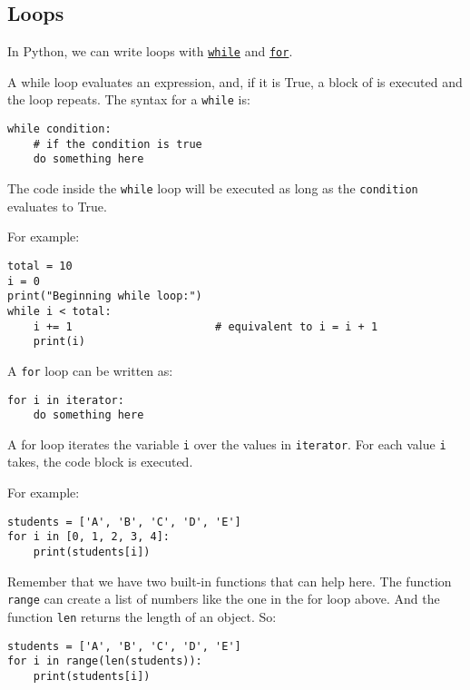 \documentclass[12pt, a4paper]{article}
\begin{document}
\subsection{Loops}
\label{sec:orgd7c340f}
In Python, we can write loops with \href{https://docs.python.org/3.6/tutorial/introduction.html\#first-steps-towards-programming}{\texttt{while}} and \href{https://docs.python.org/3.6/tutorial/controlflow.html\#for-statements}{\texttt{for}}.

A while loop evaluates an expression, and, if it is True, a block of is executed and the loop repeats.
The syntax for a \texttt{while} is:
\lstset{language=jupyter-python,label= ,caption= ,captionpos=b,numbers=none}
\begin{lstlisting}
while condition:
    # if the condition is true
    do something here
\end{lstlisting}
The code inside the \texttt{while} loop will be executed as long as the \texttt{condition} evaluates to True.

For example:
\lstset{language=jupyter-python,label= ,caption= ,captionpos=b,numbers=none}
\begin{lstlisting}
total = 10
i = 0
print("Beginning while loop:")
while i < total:
    i += 1                      # equivalent to i = i + 1
    print(i)
\end{lstlisting}

A \texttt{for} loop can be written as:
\lstset{language=jupyter-python,label= ,caption= ,captionpos=b,numbers=none}
\begin{lstlisting}
for i in iterator:
    do something here
\end{lstlisting}
A for loop iterates the variable \texttt{i} over the values in \texttt{iterator}.
For each value \texttt{i} takes, the code block is executed.

For example:
\lstset{language=jupyter-python,label= ,caption= ,captionpos=b,numbers=none}
\begin{lstlisting}
students = ['A', 'B', 'C', 'D', 'E']
for i in [0, 1, 2, 3, 4]:
    print(students[i])
\end{lstlisting}

Remember that we have two built-in functions that can help here. The function \texttt{range} can create a list of numbers like the one in the for loop above. And the function \texttt{len} returns the length of an object.
So:
\lstset{language=jupyter-python,label= ,caption= ,captionpos=b,numbers=none}
\begin{lstlisting}
students = ['A', 'B', 'C', 'D', 'E']
for i in range(len(students)):
    print(students[i])
\end{lstlisting}
\end{document}
